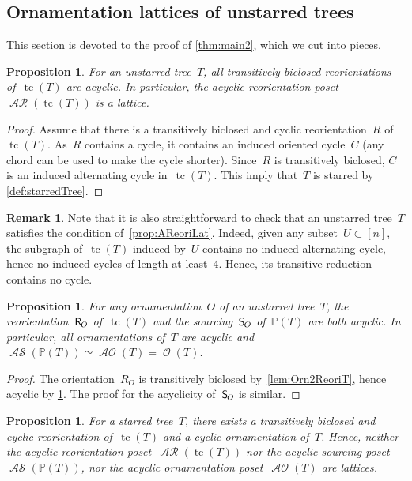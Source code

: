 \documentclass{amsart}
\newtheorem{proposition}[theorem]{Proposition}
\theoremstyle{definition}
\newtheorem{remark}[theorem]{Remark}
\renewcommand{\c}[1]{\mathcal{#1}} %
\DeclareMathOperator{\tc}{tc} %
\newcommand{\mymap}[2]{\mathsf{#1}_{\hspace{-.7pt}#2}}
\DeclareMathOperator{\Orn}{\c{O}}  %
\DeclareMathOperator{\AOrn}{\c{AO}}  %
\newcommand{\reori}[1]{\mymap{R}{#1}}  %
\DeclareMathOperator{\AReori}{\c{AR}}  %
\newcommand{\sour}[1]{\mymap{S}{#1}}  %
\DeclareMathOperator{\ASour}{\mathcal{AS}}  %
\newcommand{\PP}{\mathbb P} %
\begin{document}

\subsection{Ornamentation lattices of unstarred trees}
\label{subsec:OrnUT}

This section is devoted to the proof of \cref{thm:main2}, which we cut into pieces.

\begin{proposition}
\label{prop:AReoriLatticeUT}
For an unstarred tree~$T$, all transitively biclosed reorientations of~$\tc(T)$ are acyclic.
In particular, the acyclic reorientation poset~$\AReori(\tc(T))$ is a lattice.
\end{proposition}

\begin{proof}
Assume that there is a transitively biclosed and cyclic reorientation~$R$ of~$\tc(T)$.
As~$R$ contains a cycle, it contains an induced oriented cycle~$C$ (any chord can be used to make the cycle shorter).
Since~$R$ is transitively biclosed, $C$ is an induced alternating cycle in~$\tc(T)$.
This imply that~$T$ is starred by \cref{def:starredTree}.
\end{proof}

\begin{remark}
Note that it is also straightforward to check that an unstarred tree~$T$ satisfies the condition of~\cref{prop:AReoriLat}.
Indeed, given any subset~$U \subset [n]$, the subgraph of~$\tc(T)$ induced by~$U$ contains no induced alternating cycle, hence no induced cycles of length at least~$4$.
Hence, its transitive reduction contains no cycle.
\end{remark}

\begin{proposition}
\label{prop:AOrnLatticeUT}
For any ornamentation~$O$ of an unstarred tree~$T$, the reorientation~$\reori{O}$ of~$\tc(T)$ and the sourcing~$\sour{O}$ of~$\PP(T)$ are both acyclic.
In particular, all ornamentations of~$T$ are acyclic and~$\ASour(\PP(T)) \simeq \AOrn(T) = \Orn(T)$.
\end{proposition}

\begin{proof}
The orientation~$R_O$ is transitively biclosed by~\cref{lem:Orn2ReoriT}, hence acyclic by \cref{prop:AReoriLatticeUT}.
The proof for the acyclicity of~$\sour{O}$ is similar.
\end{proof}

\begin{proposition}
For a starred tree~$T$, there exists a transitively biclosed and cyclic reorientation of~$\tc(T)$ and a cyclic ornamentation of~$T$.
Hence, neither the acyclic reorientation poset~$\AReori(\tc(T))$ nor the acyclic sourcing poset~$\ASour(\PP(T))$, nor the acyclic ornamentation poset~$\AOrn(T)$ are lattices.
\end{proposition}
\end{document}
